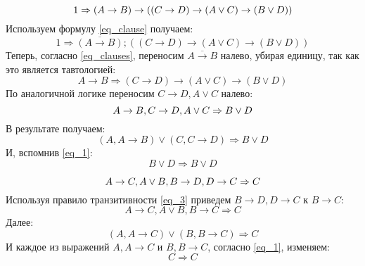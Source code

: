 \begin{task}
    \begin{equation*}
        1 \Rightarrow (A \to B) \to ((C \to D) \to (A \lor C) \to (B \lor D)) \\
    \end{equation*}
    Используем формулу \ref{eq_clause} получаем: \\
    \begin{equation*}
        1 \Rightarrow \overline{(A \to B)};((C \to D) \to (A \lor C) \to (B \lor D))
    \end{equation*}
    Теперь, согласно \ref{eq_clauses}, переносим $\overline{A \to B}$ налево, убирая единицу,
    так как это является тавтологией:
    \begin{equation*}
        A \to B \Rightarrow (C \to D) \to (A \lor C) \to (B \lor D)
    \end{equation*}
    По аналогичной логике переносим $C \to D, A \lor C$ налево:
    \begin{equation*}
        A \to B, C \to D, A \lor C \Rightarrow B \lor D \\
    \end{equation*}
    В результате получаем:
    \begin{equation*}
        (A, A \to B) \lor (C, C \to D) \Rightarrow B \lor D
    \end{equation*}
    И, вспомнив \ref{eq_1}:
    \begin{equation*}
        B \lor D \Rightarrow B \lor D
    \end{equation*}
\end{task}

\begin{task}
    \begin{equation*}
        A \to C, A \lor B, B \to D, D \to C \Rightarrow C \\
    \end{equation*}
    Используя правило транзитивности \ref{eq_3} приведем $B \to D, D \to C$ к $B \to C$:
    \begin{equation*}
        A \to C, A \lor B, B \to C \Rightarrow C
    \end{equation*}
    Далее:
    \begin{equation*}
        (A, A \to C) \lor (B, B \to C) \Rightarrow C 
    \end{equation*}
    И каждое из выражений $A, A \to C$ и $B, B \to C$, согласно \ref{eq_1}, изменяем:
    \begin{equation*}
        C \Rightarrow C        
    \end{equation*}
\end{task}

